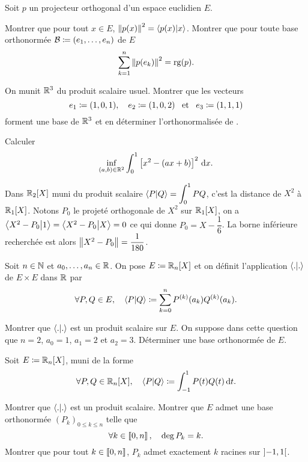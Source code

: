 \documentclass{magnolia}
\begin{document}
Soit $p$ un projecteur orthogonal d'un espace euclidien $E$.
\begin{questions}
\question Montrer que pour tout $x\in E$, $\left\|p(x)\right\|^2=\left\langle {p(x)}\middle|{x}\right\rangle$.
\question Montrer que pour toute base orthonormée $\mathcal{B}\coloneqq(e_1,\ldots,e_n)$ de $E$
  \[\sum_{k=1}^n \left\|p(e_k)\right\|^2=\operatorname{rg}(p).\]
\end{questions}





On munit $\mathbb{R}^3$ du produit scalaire usuel. Montrer que les vecteurs
\[e_1\coloneqq(1,0,1),\quad e_2\coloneqq(1,0,2) \quad\!\text{et}\quad\! e_3\coloneqq(1,1,1)\]
forment une base de $\mathbb{R}^3$ et en déterminer l'orthonormalisée de .



Calculer
\[\inf_{(a,b)\in \mathbb{R}^2} \int_{0}^{1} \left[x^2-(ax+b)\right]^2\,\text{d}x.\]
\begin{sol}
Dans $\mathbb{R}_2[X]$ muni du produit scalaire $\left\langle {P}\middle|{Q}\right\rangle = \displaystyle\int_0^1 PQ$, c'est la distance de $X^2$ à $\mathbb{R}_1[X]$. 
Notons $P_0$ le projeté orthogonale de $X^2$ sur $\mathbb{R}_1[X]$, on a $\left\langle {X^2-P_0}\middle|{1}\right\rangle = \left\langle {X^2-P_0}\middle|{X}\right\rangle = 0$ ce qui donne $P_0 = X-\dfrac{1}{6}$. 
La borne inférieure recherchée est alors $\left\|X^2-P_0\right\| = \dfrac{1}{180}$.
\end{sol}


Soit $n\in\mathbb{N}$ et $a_0,\ldots,a_n\in\mathbb{R}$. On pose $E\defeq\polyR[n]$ et on définit
l'application $\left\langle {.}\middle|{.}\right\rangle$ de $E\times E$ dans $\mathbb{R}$ par
\[\forall P,Q\in E ,\quad \left\langle {P}\middle|{Q}\right\rangle\coloneqq\sum_{k=0}^n P^{(k)}(a_k)Q^{(k)}(a_k).\]
\begin{questions}
\question Montrer que $\left\langle {.}\middle|{.}\right\rangle$ est un produit scalaire sur $E$.
\question On suppose dans cette question que $n=2$, $a_0=1$, $a_1=2$ et $a_2=3$. Déterminer
  une base orthonormée de $E$.
\end{questions}

Soit $E\defeq\polyR[n]$, muni de la forme
\[\forall P,Q\in\polyR[n]\qsep \ps{P}{Q}\defeq\integ{-1}{1}{P(t)Q(t)}{t}.\]
\begin{questions}
\question Montrer que $\left\langle {.}\middle|{.}\right\rangle$ est un produit scalaire.
\question Montrer que $E$ admet une base orthonormée $(P_k)_{0\leq k\leq n}$ telle que
  \[\forall k\in\left\llbracket 0,n\right\rrbracket ,\quad \deg P_k=k.\]
\question Montrer que pour tout $k\in\left\llbracket 0,n\right\rrbracket$, $P_k$ admet exactement $k$
  racines sur $\left]-1,1\right[$.
\end{questions}
\end{document}
